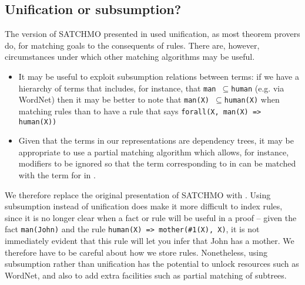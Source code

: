 \documentclass[11pt,a4paper]{article}
\newcommand{\sub}{$\subseteq$}
\begin{document}
\subsection{Unification or subsumption?}

The version of SATCHMO presented in  used unification, as
most theorem provers do, for
matching goals to the consequents of rules. There are, however,
circumstances under which other matching algorithms may be useful.

\begin{itemize}
\item
It may be useful to exploit subsumption relations between terms:
if we have a hierarchy of terms that includes, for instance, that
\texttt{man \sub  human} (e.g. via WordNet) then it may be better to note that \texttt{man(X)
  \sub human(X)} when matching rules than to have a rule that says \texttt{forall(X, man(X) =>
  human(X))} 
\item
Given that the terms in our representations are dependency trees, it
may be appropriate to use a partial matching algorithm which allows,
for instance, modifiers to be ignored so that the term corresponding
to  in  can
be matched with the term for  in .
\end{itemize}

We therefore replace the original presentation of SATCHMO with
. Using subsumption instead of unification
does make it more difficult to index rules, since it is no longer
clear when a fact or rule will be useful in a proof -- given the fact
\texttt{man(John)} and the rule \texttt{human(X) => mother(\#1(X), X)},
it is not immediately evident that this rule will let you infer that
John has a mother. We therefore have to be careful about how we store
rules. Nonetheless, using subsumption rather than unification has the
potential to unlock resources such as WordNet, and also to add extra
facilities such as partial matching of subtrees.
\end{document}
